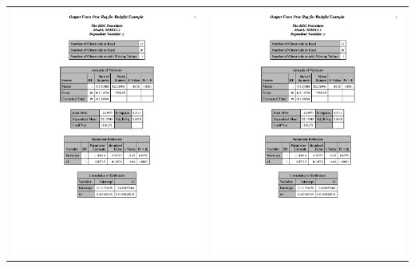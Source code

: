 \begin{center}
\begin{tabular}{cc}
\includegraphics[page=3,scale=0.6,trim=40mm 30mm 20mm 10mm]{bodyfatexample}&
\includegraphics[page=4,scale=0.6,trim=40mm 30mm 20mm 10mm]{bodyfatexample}\\

\end{tabular}
\end{center}
